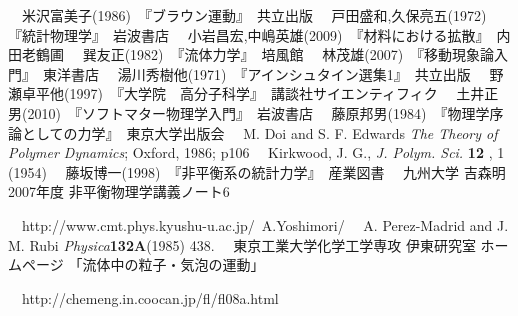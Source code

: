 \documentclass{jsarticle}
\begin{document}
\begin{thebibliography}{99}
　米沢富美子(1986)　『ブラウン運動』　共立出版
　戸田盛和,久保亮五(1972)　『統計物理学』　岩波書店
　小岩昌宏,中嶋英雄(2009)　『材料における拡散』　内田老鶴圃
　巽友正(1982)　『流体力学』　培風館
　林茂雄(2007)　『移動現象論入門』　東洋書店
　湯川秀樹他(1971)　『アインシュタイン選集1』　共立出版
　野瀬卓平他(1997)　『大学院　高分子科学』　講談社サイエンティフィク
　土井正男(2010)　『ソフトマター物理学入門』　岩波書店
　藤原邦男(1984)　『物理学序論としての力学』　東京大学出版会
　M. Doi and S. F. Edwards {\it The Theory of Polymer Dynamics}; Oxford, 1986; p106
　Kirkwood, J. G., {\it J. Polym. Sci.} {\bf 12} , 1 (1954)
　藤坂博一(1998)　『非平衡系の統計力学』　産業図書
　九州大学 吉森明 2007年度 非平衡物理学講義ノート6

　http://www.cmt.phys.kyushu-u.ac.jp/~A.Yoshimori/
　A. Perez-Madrid and J. M. Rubi {\it Physica}{\bf 132A}(1985) 438.
　東京工業大学化学工学専攻 伊東研究室 ホームページ 「流体中の粒子・気泡の運動」

　http://chemeng.in.coocan.jp/fl/fl08a.html
\end{thebibliography}
\end{document}
